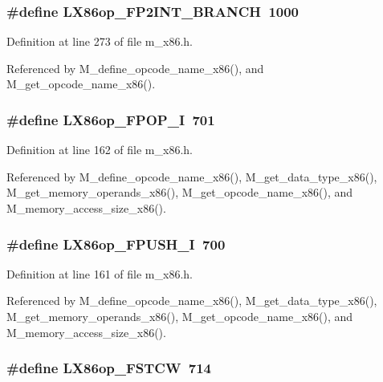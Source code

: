 \subsubsection{\setlength{\rightskip}{0pt plus 5cm}\#define LX86op\_\-FP2INT\_\-BRANCH~1000}\label{m__x86_8h_41747cda3bf3938ab17cd75e2d531361}




Definition at line 273 of file m\_\-x86.h.

Referenced by M\_\-define\_\-opcode\_\-name\_\-x86(), and M\_\-get\_\-opcode\_\-name\_\-x86().
\subsubsection{\setlength{\rightskip}{0pt plus 5cm}\#define LX86op\_\-FPOP\_\-I~701}\label{m__x86_8h_a34602390605220e5f6a3763c4b0555b}




Definition at line 162 of file m\_\-x86.h.

Referenced by M\_\-define\_\-opcode\_\-name\_\-x86(), M\_\-get\_\-data\_\-type\_\-x86(), M\_\-get\_\-memory\_\-operands\_\-x86(), M\_\-get\_\-opcode\_\-name\_\-x86(), and M\_\-memory\_\-access\_\-size\_\-x86().
\subsubsection{\setlength{\rightskip}{0pt plus 5cm}\#define LX86op\_\-FPUSH\_\-I~700}\label{m__x86_8h_50faac2ab46bb72e956c4693842ca74c}




Definition at line 161 of file m\_\-x86.h.

Referenced by M\_\-define\_\-opcode\_\-name\_\-x86(), M\_\-get\_\-data\_\-type\_\-x86(), M\_\-get\_\-memory\_\-operands\_\-x86(), M\_\-get\_\-opcode\_\-name\_\-x86(), and M\_\-memory\_\-access\_\-size\_\-x86().
\subsubsection{\setlength{\rightskip}{0pt plus 5cm}\#define LX86op\_\-FSTCW~714}\label{m__x86_8h_7088029e9cb48ed87149460995452f29}




